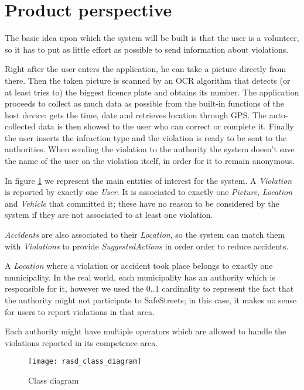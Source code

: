 \section{Product perspective}
The basic idea upon which the system will be built is that the user is a
volunteer, so it has to put as little effort as possible to send information
about violations.

Right after the user enters the application, he can take a picture directly from
there. Then the taken picture is scanned by an OCR algorithm that detects (or at
least tries to) the biggest licence plate and obtains its number. The
application proceeds to collect as much data as possible from the built-in
functions of the host device: gets the time, date and retrieves location through
GPS.
The auto-collected data is then showed to the user who can correct or
complete it. Finally the user inserts the infraction type and the violation is
ready to be sent to the authorities.
When sending the violation to the authority the system doesn't save the name
of the user on the violation itself, in order for it to remain anonymous.

In figure \ref{fig:classDiagram} we represent the main entities of interest
for the system.
A \emph{Violation} is reported by exactly one \emph{User}. It is associated to
exactly one \emph{Picture}, \emph{Location} and \emph{Vehicle} that committed it;
these have no reason to be considered by the system if they are not associated
to at least one violation.

\emph{Accidents} are also associated to their \emph{Location}, so the system can
match them with \emph{Violations} to provide \emph{SuggestedActions} in order
order to reduce accidents.

A \emph{Location} where a violation or accident took place belongs to exactly
one municipality. In the real world, each municipality has an authority which is
responsible for it, however we used the $0..1$ cardinality to represent the
fact that the authority might not participate to SafeStreets; in this case, it
makes no sense for users to report violations in that area.

Each authority might have multiple operators which are allowed to handle the
violations reported in its competence area.

\begin{figure}[H]
    \centering
    \texttt{[image: rasd\_class\_diagram]}
    \caption{Class diagram}
    \label{fig:classDiagram}
\end{figure}

